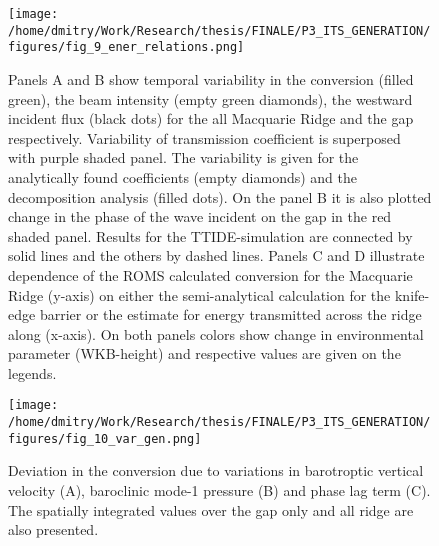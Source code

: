 \documentclass[12pt]{article}
\newcommand{\SCALEO}{2}
\newcommand{\SCALET}{1.5}
\begin{document}
\begin{figure}
	\centering
	\texttt{[image: /home/dmitry/Work/Research/thesis/FINALE/P3\_ITS\_GENERATION/figures/fig\_9\_ener\_relations.png]}
	\caption{Panels A and B show temporal variability in the conversion (filled green), the beam 
	intensity 	(empty green diamonds), the westward incident flux (black dots) for the all 
	Macquarie Ridge and the gap respectively. Variability of transmission coefficient is superposed 
	with purple shaded panel. The variability is given for the analytically found coefficients 
	(empty diamonds) and the decomposition analysis (filled dots). On the panel B it is also 
	plotted change in the phase of the wave incident on the gap in the red shaded panel. Results 
	for the 
	TTIDE-simulation are connected by solid lines and the others by dashed lines. Panels C and D 
	illustrate dependence of the ROMS calculated conversion for the Macquarie Ridge (y-axis) on 
	either the semi-analytical calculation for the knife-edge barrier or the estimate for 
	energy transmitted across the ridge along (x-axis). On both panels colors show change in 
	environmental parameter (WKB-height) and respective values are given on the legends.}
	\label{C3.fig:ener_var}
\end{figure}

\begin{figure}
	\centering
	\texttt{[image: /home/dmitry/Work/Research/thesis/FINALE/P3\_ITS\_GENERATION/figures/fig\_10\_var\_gen.png]}
	\caption{Deviation in the conversion due to variations in barotroptic vertical velocity (A), 
	baroclinic mode-1 pressure (B) and phase lag term (C). The spatially integrated values over the 
	gap only and all ridge are also presented.}
	\label{C3.fig:var_sp}
\end{figure}



\end{document}
